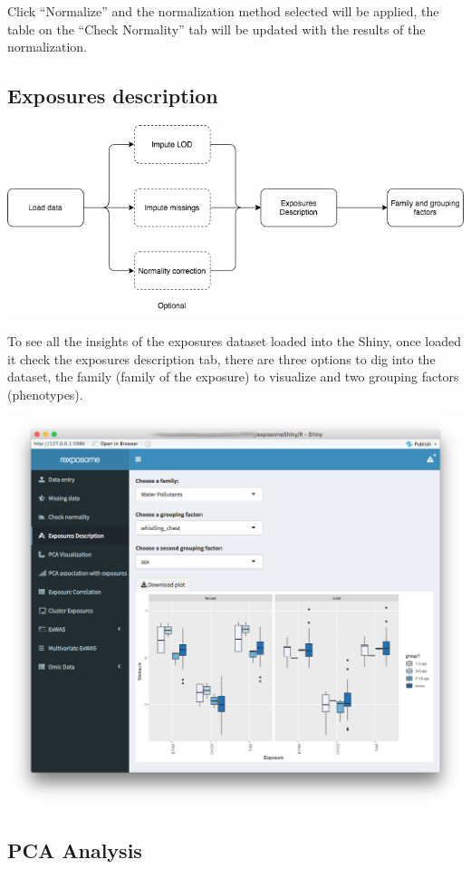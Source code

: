 \documentclass[
]{book}
\begin{document}
Click ``Normalize'' and the normalization method selected will be applied, the table on the ``Check Normality'' tab will be updated with the results of the normalization.

\hypertarget{exposures-description}{%
\subsection{Exposures description}\label{exposures-description}}

\includegraphics{images/analysis4_1.png}

To see all the insights of the exposures dataset loaded into the Shiny, once loaded it check the exposures description tab, there are three options to dig into the dataset, the family (family of the exposure) to visualize and two grouping factors (phenotypes).

\includegraphics{images/analysis4_2.png}

\hypertarget{pca-analysis}{%
\subsection{PCA Analysis}\label{pca-analysis}}
\end{document}
